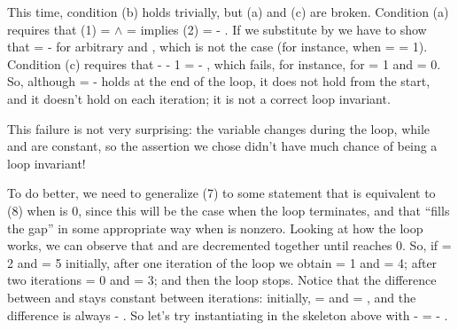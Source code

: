 \documentclass[12pt]{report}
\begin{document}
    This time, condition (b) holds trivially, but (a) and (c) are
    broken. Condition (a) requires that (1)  =  \ensuremath{\land}  = 
    implies (2)  =  - .  If we substitute  by  we have to
    show that  =  -  for arbitrary  and , which is not
    the case (for instance, when  =  = 1).  Condition (c) requires
    that  -  - 1 =  - , which fails, for instance, for  = 1
    and  = 0. So, although  =  -  holds at the end of the loop,
    it does not hold from the start, and it doesn't hold on each
    iteration; it is not a correct loop invariant.


    This failure is not very surprising: the variable  changes
    during the loop, while  and  are constant, so the assertion
    we chose didn't have much chance of being a loop invariant!


    To do better, we need to generalize (7) to some statement that is
    equivalent to (8) when  is 0, since this will be the case
    when the loop terminates, and that ``fills the gap'' in some
    appropriate way when  is nonzero.  Looking at how the loop
    works, we can observe that  and  are decremented together
    until  reaches 0.  So, if  = 2 and  = 5 initially,
    after one iteration of the loop we obtain  = 1 and  = 4;
    after two iterations  = 0 and  = 3; and then the loop stops.
    Notice that the difference between  and  stays constant
    between iterations: initially,  =  and  = , and the
    difference is always  - .  So let's try instantiating  in
    the skeleton above with  -  =  - .
\end{document}
